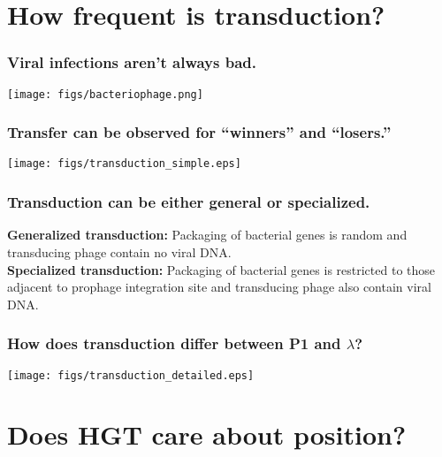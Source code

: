 \section{How frequent is transduction?}



\begin{frame}
	\frametitle{Viral infections aren't always bad.}
	\centerline{\texttt{[image: figs/bacteriophage.png]}}
\end{frame}

\begin{frame}
	\frametitle{Transfer can be observed for ``winners'' and ``losers.''}
	\centerline{\texttt{[image: figs/transduction\_simple.eps]}}
\end{frame}

\begin{frame}
	\frametitle{Transduction can be either general or specialized.}
	\textbf{Generalized transduction:} Packaging of bacterial genes is
	\alert{random} and transducing phage contain \alert{no viral DNA.}\\
	\vspace*{1em}
	\textbf{Specialized transduction:} Packaging of bacterial genes is
	\alert{restricted} to those adjacent to prophage integration site and
	transducing phage also contain \alert{viral DNA}.
\end{frame}
\begin{frame}
	\frametitle{How does transduction differ between P1 and $\lambda$?}
	\centerline{\texttt{[image: figs/transduction\_detailed.eps]}}
\end{frame}


\section{Does HGT care about position?}

